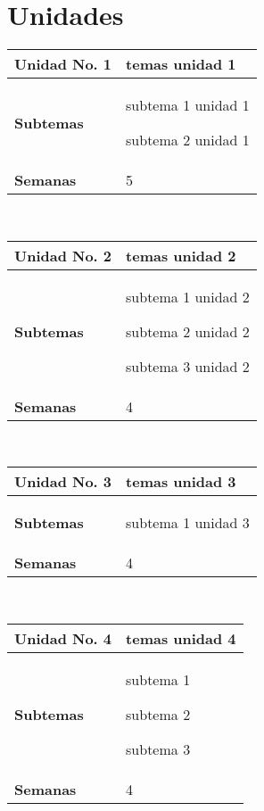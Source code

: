 \documentclass[11pt]{article}
\begin{document}
\section*{Unidades}
\noindent 
\begin{tabular}{R{0.16\textwidth} L{0.7\textwidth}} 
 \\ 
\toprule \textbf{Unidad No. 1 } &  temas unidad 1  
 \\ 
\midrule\textbf{Subtemas} & 
\begin{description}
  \item subtema 1 unidad 1 \item subtema 2 unidad 1  
\end{description}
 \\ 
\textbf{Semanas} &  5  
\end{tabular} 
 \\ 
 \begin{tabular}{R{0.16\textwidth} L{0.7\textwidth}} 
 \\ 
\toprule \textbf{Unidad No. 2 } &  temas unidad 2  
 \\ 
\midrule\textbf{Subtemas} & 
\begin{description}
  \item subtema 1 unidad 2 \item subtema 2 unidad 2 \item subtema 3 unidad 2  
\end{description}
 \\ 
\textbf{Semanas} &  4  
\end{tabular} 
 \\ 
 \begin{tabular}{R{0.16\textwidth} L{0.7\textwidth}} 
 \\ 
\toprule \textbf{Unidad No. 3 } &  temas unidad 3  
 \\ 
\midrule\textbf{Subtemas} & 
\begin{description}
  \item subtema 1 unidad 3  
\end{description}
 \\ 
\textbf{Semanas} &  4  
\end{tabular} 
 \\ 
 \begin{tabular}{R{0.16\textwidth} L{0.7\textwidth}} 
 \\ 
\toprule \textbf{Unidad No. 4 } &  temas unidad 4  
 \\ 
\midrule\textbf{Subtemas} & 
\begin{description}
  \item subtema 1 \item subtema 2 \item subtema 3  
\end{description}
 \\ 
\textbf{Semanas} &  4  
\end{tabular} 
 \\ 
 
\end{document}
